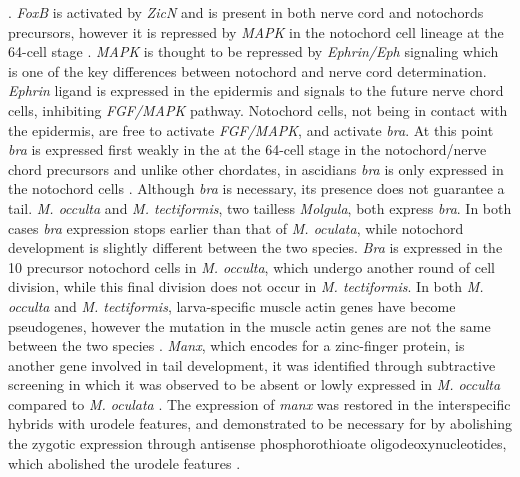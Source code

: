 . \textit{FoxB} is activated by \textit{ZicN} and is present in both nerve cord and notochords precursors, however it is repressed by \textit{MAPK} in the notochord cell lineage at the 64-cell stage \cite{hashimoto_transcription_2011}. \textit{MAPK} is thought to be repressed by \textit{Ephrin/Eph} signaling which is one of the key differences between notochord and nerve cord determination. \textit{Ephrin} ligand is expressed in the epidermis and signals to the future nerve chord cells, inhibiting \textit{FGF/MAPK} pathway. Notochord cells, not being in contact with the epidermis, are free to activate \textit{FGF/MAPK}, and activate \textit{bra}. At this point \textit{bra} is expressed first weakly in the at the 64-cell stage in the notochord/nerve chord precursors \cite{yasuo_ascidian_1994} and unlike other chordates, in ascidians \textit{bra} is only expressed in the notochord cells \cite{yasuo_function_1993,corbo_characterization_1997,hotta_temporal_1999,takada_brachyury_2002}. Although \textit{bra} is necessary, its presence does not guarantee a tail. \textit{M. occulta} and \textit{M. tectiformis}, two tailless \textit{Molgula}, both express \textit{bra}. In both cases \textit{bra} expression stops earlier than that of \textit{M. oculata}, while notochord development is slightly different between the two species. \textit{Bra} is expressed in the 10 precursor notochord cells in \textit{M. occulta}, which undergo another round of cell division, while this final division does not occur in \textit{M. tectiformis}.  In  both \textit{M. occulta} and \textit{M. tectiformis}, larva-specific muscle actin genes have become pseudogenes, however the mutation in the muscle actin genes are not the same between the two species  \cite{swalla_novel_1993,jeffery_evolution_1999}. \textit{Manx}, which encodes for a zinc-finger protein, is another gene involved in tail development, it was identified through subtractive screening in which it was observed to be absent or lowly expressed in \textit{M. occulta} compared to \textit{M. oculata} \cite{swalla_novel_1993}. The expression of \textit{manx} was restored in the interspecific hybrids with urodele features, and demonstrated to be necessary for by abolishing the zygotic expression through antisense phosphorothioate oligodeoxynucleotides, which abolished the urodele features \cite{swalla_requirement_1996, swalla_multigene_1999}. %
  
